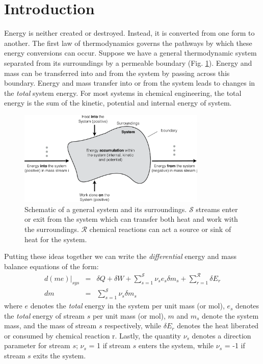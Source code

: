 \documentclass[11pt]{article}
\theoremstyle{definition}
\begin{document}
\clearpage

\section*{Introduction}
Energy is neither created or destroyed. Instead, it is converted from one form to another.
The first law of thermodynamics governs the pathways by which these energy conversions can occur.
Suppose we have a general thermodynamic system separated from its surroundings by a permeable boundary (Fig. \ref{fig-energy-schematic}).
Energy and mass can be transferred into and from the system by passing across this boundary.
Energy and mass transfer into or from the system leads to changes in the \emph{total} system energy.
For most systems in chemical engineering, the total energy is the sum of the kinetic, potential and
internal energy of system.
\begin{figure}[!ht]\center
  \includegraphics[width=0.80\textwidth]{./figs/EnergySchematic.pdf}
  \caption{Schematic of a general system and its surroundings. $\mathcal{S}$ streams enter or exit from the system which can transfer both heat and work with the surroundings.
  $\mathcal{R}$ chemical reactions can act a source or sink of heat for the system.}
  \label{fig-energy-schematic}
\end{figure}
Putting these ideas together we can write the \textit{differential} energy and mass balance equations of the form:
\begin{eqnarray}\label{eqn:energy-balance-precursor}
d\left(me\right)\Bigr|_{sys} &=& \delta{Q}+\delta{W}+\sum_{s=1}^{\mathcal{S}}\nu_{s}e_{s}\delta{m}_{s} + \sum_{r=1}^{\mathcal{R}}\delta E_{r}\\\label{eqn:material-balance-precursor}
dm &=& \sum_{s=1}^{\mathcal{S}}\nu_{s}\delta{m}_{s}
\end{eqnarray}where $e$ denotes the \textit{total} energy in the system per unit mass (or mol), $e_{s}$ denotes the \textit{total} energy of stream $s$ per unit mass (or mol),
$m$ and $m_{s}$ denote the system mass, and the mass of stream $s$ respectively, while $\delta E_{r}$ denotes the heat liberated or consumed by chemical reaction r.
Lastly, the quantity $\nu_{s}$ denotes a direction parameter for stream $s$; $\nu_{s}$ = 1 if stream $s$ enters the system, while $\nu_{s}$ = -1 if stream $s$ exits the system.
\end{document}
